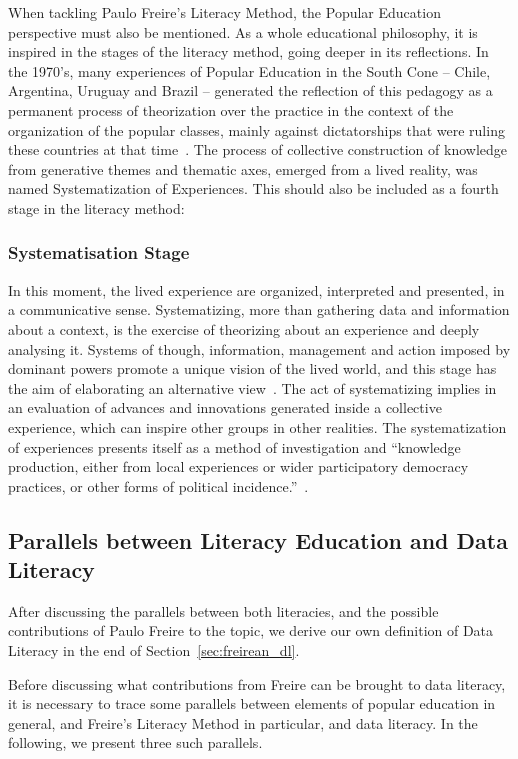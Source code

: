 When tackling Paulo Freire's Literacy Method, the Popular Education perspective must also be mentioned. As a whole educational philosophy, it is inspired in the stages of the literacy method, going deeper in its reflections. In the 1970's, many experiences of Popular Education in the South Cone –  Chile, Argentina, Uruguay and Brazil – generated the reflection of this pedagogy as a permanent process of theorization over the practice in the context of the organization of the popular classes, mainly against dictatorships that were ruling these countries at that time~\cite{Jara1998}. The process of collective construction of knowledge from generative themes and thematic axes, emerged from a lived reality, was named Systematization of Experiences. This should also be included as a fourth stage in the literacy method:

\subsubsection{Systematisation Stage}
In this moment, the lived experience are organized, interpreted and presented, in a communicative sense. Systematizing, more than gathering data and information about a context, is the exercise of theorizing about an experience and deeply analysing it. Systems of though, information, management and action imposed by dominant powers promote a unique vision of the lived world, and this stage has the aim of elaborating an alternative view~\cite{Ghiso2011}. The act of systematizing implies in an evaluation of advances and innovations generated inside a collective experience, which can inspire other groups in other realities. The systematization of experiences presents itself as a method of investigation and “knowledge production, either from local experiences or wider participatory democracy practices, or other forms of political incidence.”~\cite{Adams2010}.

\subsection{Parallels between Literacy Education and Data Literacy}
After discussing the parallels between both literacies, and the possible contributions of Paulo Freire to the topic, we derive our own definition of Data Literacy in the end of Section~\ref{sec:freirean_dl}.

Before discussing what contributions from Freire can be brought to data literacy, it is necessary to trace some parallels between elements of popular education in general, and Freire's Literacy Method in particular, and data literacy. In the following, we present three such parallels. 

